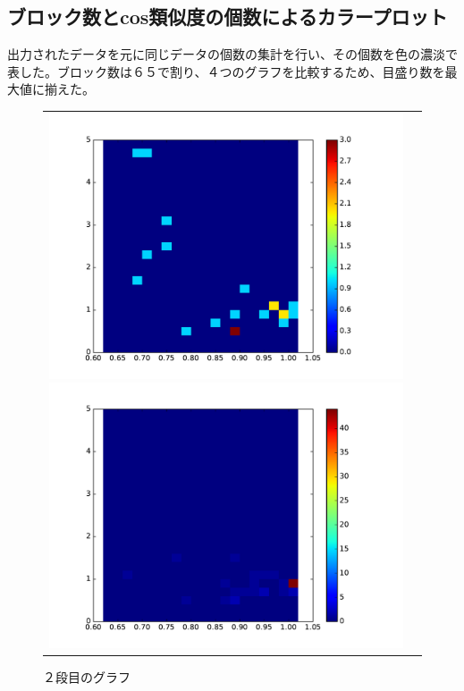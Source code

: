 \documentclass[a4paper,10pt,onecolumn,oneside,openany]{jsbook}
\begin{document}
 
  \subsection{ブロック数とcos類似度の個数によるカラープロット}
出力されたデータを元に同じデータの個数の集計を行い、その個数を色の濃淡で表した。ブロック数は６５で割り、４つのグラフを比較するため、目盛り数を最大値に揃えた。 
 
\begin{figure}[h]
 \begin{tabular}{cc}
 	\begin{minipage}[t]{0.45\hsize}
	 \centering
	 \includegraphics[keepaspectratio, scale = 0.35]{colormap_maze_block_1.pdf}
	 \caption{１段目のグラフ}
	 \label{first_maze_block_color}
	\end{minipage}
        \begin{minipage}[t]{0.45\hsize}
	 \centering
	 \includegraphics[keepaspectratio, scale = 0.35]{colormap_maze_block_2.pdf}
	 \caption{２段目のグラフ}
	 \label{second_maze_block_color}
	\end{minipage}
 \end{tabular}
 \end{figure}
\end{document}
